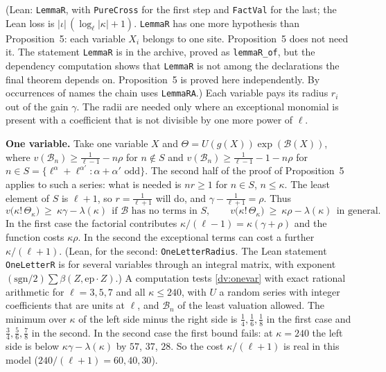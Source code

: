 \documentclass[11pt,letterpaper]{article}
\begin{document}
\noindent (Lean: \texttt{LemmaR}, with \texttt{PureCross} for the first step and \texttt{FactVal} for the
last; the Lean loss is $|\iota|\,(\log_\ell|\kappa|+1)$. \texttt{LemmaR} has one more hypothesis than
Proposition~5: each variable $X_i$ belongs to one site. Proposition~5 does not need it. The statement \texttt{LemmaR} is in the archive,
proved as \texttt{lemmaR\_of}, but the dependency computation shows that \texttt{LemmaR} is not among the
declarations the final theorem depends on. Proposition~5 is proved here independently. By occurrences of
names the chain uses \texttt{LemmaRA}.) Each variable pays its radius $r_i$ out of the gain
$\gamma$. The radii are needed only where an exceptional monomial is present with a coefficient that is not
divisible by one more power of $\ell$.

\textbf{One variable.} Take one variable $X$ and $\Theta=U(g(X))\exp(\mathcal B(X))$, where
$v(\mathcal B_n)\ge\frac1{\ell-1}-n\rho$ for $n\notin S$ and $v(\mathcal B_n)\ge\frac1{\ell-1}-1-n\rho$ for
$n\in S=\{\ell^\alpha+\ell^{\alpha'}:\alpha+\alpha'\text{ odd}\}$. The second half of the proof of Proposition~5 applies to such a series: what is needed is
$nr\ge1$ for $n\in S$, $n\le\kappa$. The least element of $S$ is $\ell+1$, so $r=\frac1{\ell+1}$ will do,
and $\gamma-\frac1{\ell+1}=\rho$. Thus
\begin{equation}\label{dv:onevar}
 v\big(\kappa!\,\Theta_\kappa\big)\ \ge\ \kappa\gamma-\lambda(\kappa)\ \ \text{if }\mathcal B\text{ has no terms in }S,
 \qquad v\big(\kappa!\,\Theta_\kappa\big)\ \ge\ \kappa\rho-\lambda(\kappa)\ \ \text{in general.}
\end{equation}
In the first case the factorial contributes $\kappa/(\ell-1)=\kappa(\gamma+\rho)$ and the function costs
$\kappa\rho$. In the second the exceptional terms can cost a further $\kappa/(\ell+1)$. (Lean, for the second:
\texttt{OneLetterRadius}. The Lean statement \texttt{OneLetterR} is for several variables through an
integral matrix, with exponent $(\mathrm{sgn}/2)\sum\beta(Z,\mathrm{ep}\cdot Z)$.) A computation tests \eqref{dv:onevar} with exact
rational arithmetic for $\ell=3,5,7$ and all $\kappa\le240$, with $U$ a random series with integer
coefficients that are units at $\ell$, and $\mathcal B_n$ of the least valuation allowed. The minimum over $\kappa$ of the left side
minus the right side is $\frac14,\frac16,\frac18$ in the first case and $\frac34,\frac56,\frac78$ in the
second. In the second case the first bound fails: at $\kappa=240$ the left side is below
$\kappa\gamma-\lambda(\kappa)$ by $57$, $37$, $28$. So the cost $\kappa/(\ell+1)$ is real in this model
($240/(\ell+1)=60,40,30$).
\end{document}
